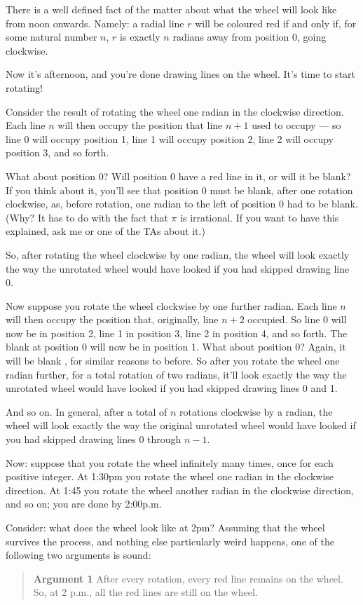 \documentclass[12pt,a4paper]{article}
\begin{document}
\begin{enumerate}
There is a well defined fact of the matter about what the wheel will look like from noon onwards. Namely: a radial line $r$ will be coloured red if and only if, for some natural number $n$, $r$ is exactly $n$ radians away from position 0, going clockwise.

Now it's afternoon, and you're done drawing lines on the wheel. It's time to start rotating!

Consider the result of rotating the wheel one radian in the clockwise direction. Each line $n$ will then occupy the position that line $n+1$ used to occupy --- so line 0 will occupy position 1, line 1 will occupy position 2, line 2 will occupy position 3, and so forth.

What about position 0? Will position 0 have a red line in it, or will it be blank? If you think about it, you'll see that position 0 must be blank, after one rotation clockwise, as, before rotation, one radian to the left of position 0 had to be blank. (Why? It has to do with the fact that $\pi$ is irrational. If you want to have this explained, ask me or one of the TAs about it.)

So, after rotating the wheel clockwise by one radian, the wheel will look exactly the way the unrotated wheel would have looked if you had skipped drawing line 0. 

Now suppose you rotate the wheel clockwise by one further radian. Each line $n$ will then occupy the position that, originally, line $n+2$ occupied. So line 0 will now be in position 2, line 1 in position 3, line 2 in position 4, and so forth. The blank at position 0 will now be in position 1. What about position 0? Again, it will be blank , for similar reasons to before. So after you rotate the wheel one radian further, for a total rotation of two radians, it'll look exactly the way the unrotated wheel would have looked if you had skipped drawing lines 0 and 1.

And so on. In general, after a total of $n$ rotations clockwise by a radian, the wheel will look exactly the way the original unrotated wheel would have looked if you had skipped drawing lines 0 through $n-1$.

Now: suppose that you rotate the wheel infinitely many times, once for each positive integer. At 1:30pm you rotate the wheel one radian in the clockwise direction. At 1:45 you rotate the wheel another radian in the clockwise direction, and so on; you are done by 2:00p.m.

Consider: what does the wheel look like at 2pm? Assuming that the wheel survives the process, and nothing else particularly weird happens, one of the following two arguments is sound:
\begin{quote}
\textbf{Argument 1}
After every rotation, every red line remains on the wheel. So, at 2 p.m., all the red lines are still on the wheel.
\end{quote}


\end{enumerate}
\end{document}
